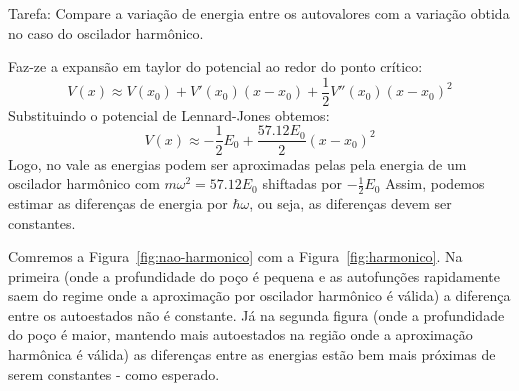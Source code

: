 \documentclass[12pt, a4paper]{article} %
\begin{document}
            Tarefa: Compare a varia\c{c}\~ao de energia entre os autovalores com a varia\c{c}\~ao obtida no caso do oscilador harm\^onico.

            Faz-ze a expansão em taylor do potencial ao redor do ponto crítico:
            \begin{equation}
                V(x) \approx V(x_0) + V'(x_0)(x - x_0) + \frac{1}{2} V''(x_0)(x - x_0)^2
            \end{equation}
            Substituindo o potencial de Lennard-Jones obtemos:
            \begin{equation}
                V(x) \approx -\frac{1}{2}E_0 + \frac{57.12E_0}{2}(x - x_0)^2
            \end{equation}
            Logo, no vale as energias podem ser aproximadas pelas pela energia de um oscilador harm\^onico com $m \omega^2 = 57.12E_0$ shiftadas por $-\frac{1}{2}E_0$
            Assim, podemos estimar as diferen\c{c}as de energia por $\hbar \omega$, ou seja, as diferen\c{c}as devem ser constantes.

            Comremos a Figura~\ref{fig:nao-harmonico} com a Figura~\ref{fig:harmonico}.
            Na primeira (onde a profundidade do poço é pequena e as autofunções rapidamente saem do regime onde a aproximação por oscilador harmônico \'e válida) a diferença entre os autoestados não é constante.  
            Já na segunda figura (onde a profundidade do poço é maior, mantendo mais autoestados na região onde a aproximação harmônica é válida) as diferenças entre as energias estão bem mais próximas de serem constantes - como esperado.
            
\end{document}
